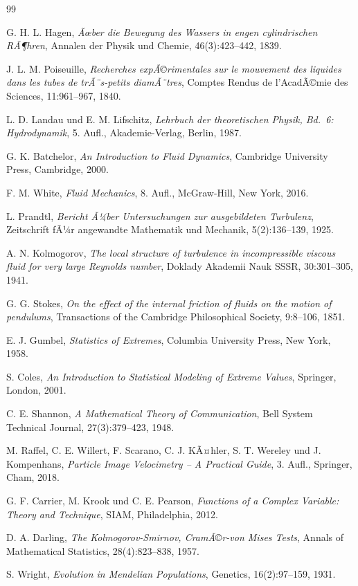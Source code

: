 ﻿\documentclass[a4paper,12pt]{article}
\theoremstyle{definition}
\begin{document}
\begin{thebibliography}{99}

G. H. L. Hagen,
\textit{Ãœber die Bewegung des Wassers in engen cylindrischen RÃ¶hren},
Annalen der Physik und Chemie, 46(3):423--442, 1839.

J. L. M. Poiseuille,
\textit{Recherches expÃ©rimentales sur le mouvement des liquides dans les tubes de trÃ¨s-petits diamÃ¨tres},
Comptes Rendus de l'AcadÃ©mie des Sciences, 11:961--967, 1840.

L. D. Landau und E. M. Lifschitz,
\textit{Lehrbuch der theoretischen Physik, Bd.~6: Hydrodynamik},
5. Aufl., Akademie-Verlag, Berlin, 1987.

G. K. Batchelor,
\textit{An Introduction to Fluid Dynamics},
Cambridge University Press, Cambridge, 2000.

F. M. White,
\textit{Fluid Mechanics},
8. Aufl., McGraw-Hill, New York, 2016.

L. Prandtl,
\textit{Bericht Ã¼ber Untersuchungen zur ausgebildeten Turbulenz},
Zeitschrift fÃ¼r angewandte Mathematik und Mechanik, 5(2):136--139, 1925.

A. N. Kolmogorov,
\textit{The local structure of turbulence in incompressible viscous fluid for very large Reynolds number},
Doklady Akademii Nauk SSSR, 30:301--305, 1941.

G. G. Stokes,
\textit{On the effect of the internal friction of fluids on the motion of pendulums},
Transactions of the Cambridge Philosophical Society, 9:8--106, 1851.

E. J. Gumbel,
\textit{Statistics of Extremes},
Columbia University Press, New York, 1958.

S. Coles,
\textit{An Introduction to Statistical Modeling of Extreme Values},
Springer, London, 2001.

C. E. Shannon,
\textit{A Mathematical Theory of Communication},
Bell System Technical Journal, 27(3):379--423, 1948.

M. Raffel, C. E. Willert, F. Scarano, C. J. KÃ¤hler, S. T. Wereley und J. Kompenhans,
\textit{Particle Image Velocimetry -- A Practical Guide},
3. Aufl., Springer, Cham, 2018.

G. F. Carrier, M. Krook und C. E. Pearson,
\textit{Functions of a Complex Variable: Theory and Technique},
SIAM, Philadelphia, 2012.

D. A. Darling,
\textit{The Kolmogorov-Smirnov, CramÃ©r-von Mises Tests},
Annals of Mathematical Statistics, 28(4):823--838, 1957.

S. Wright,
\textit{Evolution in Mendelian Populations},
Genetics, 16(2):97--159, 1931.

\end{thebibliography}
\end{document}
